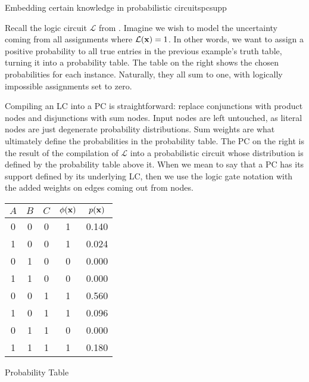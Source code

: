 \begin{example}[sidebyside,lefthand width=0.55\textwidth]{Embedding certain knowledge in probabilistic circuits}{pcsupp}

  Recall the logic circuit $\mathcal{L}$ from . Imagine we wish to model the
  uncertainty coming from all assignments where $\mathcal{L}(\mathbf{x})=1$. In other words, we want
  to assign a positive probability to all true entries in the previous example's truth table,
  turning it into a probability table. The table on the right shows the chosen probabilities for
  each instance. Naturally, they all sum to one, with logically impossible assignments set to zero.

  Compiling an LC into a PC is straightforward: replace conjunctions with product nodes and
  disjunctions with sum nodes. Input nodes are left untouched, as literal nodes are just degenerate
  probability distributions. Sum weights are what ultimately define the probabilities in the
  probability table. The PC on the right is the result of the compilation of $\mathcal{L}$ into a
  probabilistic circuit whose distribution is defined by the probability table above it. When we
  mean to say that a PC has its support defined by its underlying LC, then we use the logic gate
  notation with the added weights on edges coming out from \inode{\newOrNode} nodes.

  \tcblower
  \small%
  \begin{center}
    \begin{tabular}{ccc|cc}
      \hline
      $A$ & $B$ & $C$ & $\phi(\mathbf{x})$ & $p(\mathbf{x})$\\
      \hline
      0 & 0 & 0 & 1 & 0.140\\
      1 & 0 & 0 & 1 & 0.024\\
      0 & 1 & 0 & 0 & 0.000\\
      1 & 1 & 0 & 0 & 0.000\\
      0 & 0 & 1 & 1 & 0.560\\
      1 & 0 & 1 & 1 & 0.096\\
      0 & 1 & 1 & 0 & 0.000\\
      1 & 1 & 1 & 1 & 0.180\\
      \hline
    \end{tabular}

    Probability Table


\end{center}
\end{example}
